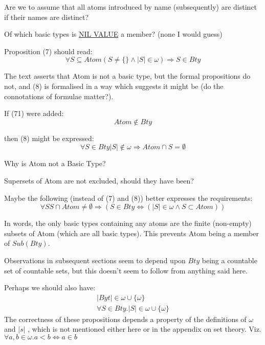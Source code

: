 Are we to assume that all atoms introduced by name (subsequently)
are distinct if their names are distinct?

Of which basic types is \underline{NIL VALUE} a member?
(none I would guess)

Proposition (7) should read:
\setcounter{equation}{6}
\begin{equation}
\forall{S \subseteq Atom}{(S \neq \{\} \wedge |S| \in \omega) \Rightarrow S \in Bty}
\end{equation}

The text asserts that Atom is not a basic type, but the formal
propositions do not, and (8) is formalised in a way which suggests
it might be (do the connotations of formulae matter?).


If (71) were added:
\setcounter{equation}{70}
\begin{equation}
Atom \notin Bty
\end{equation}


then (8) might be expressed:
\setcounter{equation}{7}
\begin{equation}
\forall {S \in Bty}{|S| \notin \omega \Rightarrow Atom \cap S = \emptyset}
\end{equation}

Why is Atom not a Basic Type?

Supersets of Atom are not excluded, should they have been?

Maybe the following (instead of (7) and (8)) better expresses
the requirements:
\begin{equation}
\forall {S}{S \cap Atom \neq \emptyset \Rightarrow
		(S \in Bty \Leftrightarrow (|S| \in \omega \wedge S \subset Atom))}
\end{equation}

In words, the only basic types containing any atoms are the finite
(non-empty) subsets of Atom (which are all basic types).
This prevents Atom being a member of $Sub(Bty)$.

Observations in subsequent sections seem to depend upon $Bty$ being a
countable set of countable sets, but this doesn't seem to follow
from anything said here.

Perhaps we should also have:
\begin{eqnarray}
|Byt|  \in \omega \cup \{\omega\}\\
\forall S \in Bty. |S|  \in \omega \cup \{\omega\}
\end{eqnarray}
The correctness of these propositions depends a property of the
definitions of $\omega$ and $|s|$ , which is not mentioned either
here or in the appendix on set theory.
Viz. $\forall a,b \in \omega. a<b \Leftrightarrow a\in b$

